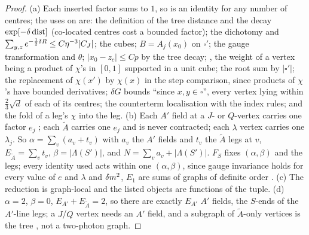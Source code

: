 \begin{proof}
(a) Each inserted factor sums to $1$, so \cite[(3.37)]{K1} is an identity for any number of centres; the uses on \cite[pp.~659--668]{K1} are: the definition of the tree distance and the decay $\exp[-\delta\operatorname{dist}]$ (co-located centres cost a bounded factor); the dichotomy and $\sum_{y,z}e^{-\frac12\delta R}\le C\eta^{-3}|C_J|$; the cubes; $B=A_j(x_0)$ on $\square'$; the gauge transformation and $\theta$; $|x_0-z_c|\le Cp$ by the tree decay; \cite[(3.68)]{K1}, the weight of a vertex being a product of $\chi$'s in $[0,1]$ supported in a unit cube; the root sum by $|\square'|$; the replacement of $\chi(x')$ by $\chi(x)$ in the step comparison, since products of $\chi$'s have bounded derivatives; $\delta G$ bounds ``since $x,y\in\square$'', every vertex lying within $\frac23\sqrt d$ of each of its centres; the counterterm localisation with the index rules; and the fold \cite[(3.85)]{K1} of a leg's $\chi$ into the leg. (b) Each $A'$ field at a $J$- or $Q$-vertex carries one factor $e_j$ \cite[(3.22)--(3.23)]{K1}; each $\tilde A$ carries one $e_j$ \cite[(3.47)--(3.53)]{K1} and is never contracted; each $\lambda$ vertex carries one $\lambda_j$. So $\alpha=\sum_v(a_v+t_v)$ with $a_v$ the $A'$ fields and $t_v$ the $\tilde A$ legs at $v$, $E_{\tilde A}=\sum_vt_v$, $\beta=|\Lambda(S')|$, and $N=\sum_va_v+|\Lambda(S')|$. $F_S$ fixes $(\alpha,\beta)$ and the legs; every identity used acts within one $(\alpha,\beta)$, since gauge invariance holds for every value of $e$ and $\lambda$ and $\delta m^2$, $E_1$ are sums of graphs of definite order \cite[(3.33)--(3.35)]{K1}. (c) The reduction is graph-local and the listed objects are functions of the tuple. (d) $\alpha=2$, $\beta=0$, $E_{A'}+E_{\tilde A}=2$, so there are exactly $E_{A'}$ $A'$ fields, the $S$-ends of the $A'$-line legs; a $J$/$Q$ vertex needs an $A'$ field, and a subgraph of $\tilde A$-only vertices is the tree \cite[(2.4)]{Ba3}, not a two-photon graph.
\end{proof}

